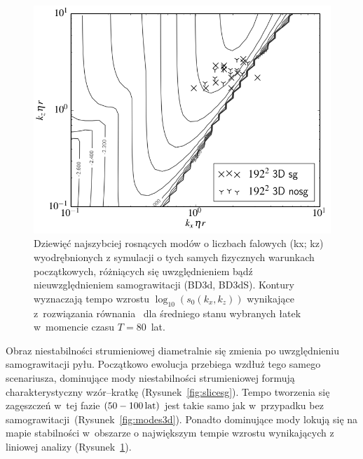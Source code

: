 %
\begin{figure}[h]
   \centering
   \includegraphics[width=0.5\linewidth]{figures/3d_map_x3_50.png}
   \caption{
      Dziewięć najszybciej rosnących modów o liczbach falowych (kx; kz)
      wyodrębnionych z symulacji o tych samych fizycznych warunkach
      początkowych, różniących się uwzględnieniem bądź nieuwzględnieniem
      samograwitacji (BD3d, BD3dS).  Kontury wyznaczają tempo wzrostu
      $\log_{10}(s_0(k_x, k_z))$ wynikające z~rozwiązania równania~
       dla średniego stanu wybranych łatek w~momencie
      czasu $T = 80$~lat.}
   \label{fig:map3d}
\end{figure}
Obraz niestabilności strumieniowej diametralnie się zmienia po
uwzględnieniu samograwitacji pyłu. Początkowo ewolucja przebiega wzdłuż tego
samego scenariusza, dominujące mody niestabilności strumieniowej formują
charakterystyczny wzór--kratkę (Rysunek~\ref{fig:slicesg}). Tempo tworzenia się
zagęszczeń w~tej fazie $(50 - 100\hbox{$\thinspace\textrm{lat}$})$ jest takie samo jak w~przypadku bez
samograwitacji~(Rysunek~\ref{fig:modes3d}). Ponadto dominujące mody lokują się
na mapie stabilności w~obszarze o największym tempie wzrostu wynikających z
liniowej analizy (Rysunek~\ref{fig:map3d}).
%
